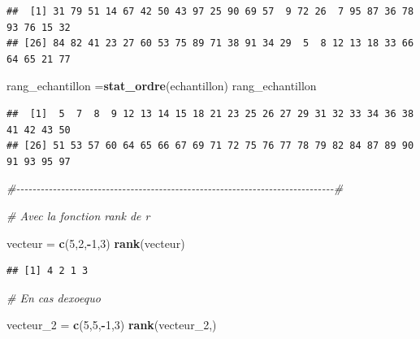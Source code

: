 \documentclass[
  12pt,
]{article}
\newenvironment{Shaded}{\begin{snugshade}}{\end{snugshade}}
\newcommand{\CommentTok}[1]{\textcolor[rgb]{0.56,0.35,0.01}{\textit{#1}}}
\newcommand{\DecValTok}[1]{\textcolor[rgb]{0.00,0.00,0.81}{#1}}
\newcommand{\FunctionTok}[1]{\textcolor[rgb]{0.13,0.29,0.53}{\textbf{#1}}}
\newcommand{\NormalTok}[1]{#1}
\newcommand{\OtherTok}[1]{\textcolor[rgb]{0.56,0.35,0.01}{#1}}
\newcommand{\SpecialCharTok}[1]{\textcolor[rgb]{0.81,0.36,0.00}{\textbf{#1}}}
\begin{document}
\begin{verbatim}
##  [1] 31 79 51 14 67 42 50 43 97 25 90 69 57  9 72 26  7 95 87 36 78 93 76 15 32
## [26] 84 82 41 23 27 60 53 75 89 71 38 91 34 29  5  8 12 13 18 33 66 64 65 21 77
\end{verbatim}

\begin{Shaded}
\begin{Highlighting}[]
\NormalTok{rang\_echantillon }\OtherTok{=}\FunctionTok{stat\_ordre}\NormalTok{(echantillon)}
\NormalTok{rang\_echantillon}
\end{Highlighting}
\end{Shaded}

\begin{verbatim}
##  [1]  5  7  8  9 12 13 14 15 18 21 23 25 26 27 29 31 32 33 34 36 38 41 42 43 50
## [26] 51 53 57 60 64 65 66 67 69 71 72 75 76 77 78 79 82 84 87 89 90 91 93 95 97
\end{verbatim}

\begin{Shaded}
\begin{Highlighting}[]
\CommentTok{\#{-}{-}{-}{-}{-}{-}{-}{-}{-}{-}{-}{-}{-}{-}{-}{-}{-}{-}{-}{-}{-}{-}{-}{-}{-}{-}{-}{-}{-}{-}{-}{-}{-}{-}{-}{-}{-}{-}{-}{-}{-}{-}{-}{-}{-}{-}{-}{-}{-}{-}{-}{-}{-}{-}{-}{-}{-}{-}{-}{-}{-}{-}{-}{-}{-}{-}{-}{-}{-}{-}{-}{-}{-}{-}{-}{-}{-}{-}\#}

\CommentTok{\# Avec la fonction rank  de r}

\NormalTok{vecteur }\OtherTok{=} \FunctionTok{c}\NormalTok{(}\DecValTok{5}\NormalTok{,}\DecValTok{2}\NormalTok{,}\SpecialCharTok{{-}}\DecValTok{1}\NormalTok{,}\DecValTok{3}\NormalTok{)}
\FunctionTok{rank}\NormalTok{(vecteur)}
\end{Highlighting}
\end{Shaded}

\begin{verbatim}
## [1] 4 2 1 3
\end{verbatim}

\begin{Shaded}
\begin{Highlighting}[]
\CommentTok{\# En cas d\textquotesingle{}exoequo}


\NormalTok{vecteur\_2 }\OtherTok{=} \FunctionTok{c}\NormalTok{(}\DecValTok{5}\NormalTok{,}\DecValTok{5}\NormalTok{,}\SpecialCharTok{{-}}\DecValTok{1}\NormalTok{,}\DecValTok{3}\NormalTok{)}
\FunctionTok{rank}\NormalTok{(vecteur\_2,)}
\end{Highlighting}
\end{Shaded}
\end{document}
